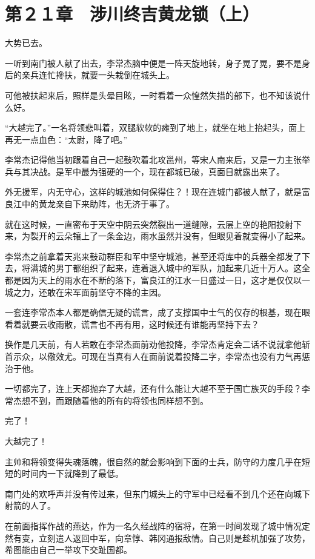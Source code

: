 \section{第２１章　涉川终吉黄龙锁（上）}

大势已去。

一听到南门被人献了出去，李常杰脑中便是一阵天旋地转，身子晃了晃，要不是身后的亲兵连忙搀扶，就要一头栽倒在城头上。

可他被扶起来后，照样是头晕目眩，一时看着一众惶然失措的部下，也不知该说什么好。

“大越完了。”一名将领悲叫着，双腿软软的瘫到了地上，就坐在地上抬起头，面上再无一点血色：“太尉，降了吧。”

李常杰记得他当初跟着自己一起鼓吹着北攻邕州，等宋人南来后，又是一力主张举兵与其决战。是军中最为强硬的一个，现在都城已破，真面目就露出来了。

外无援军，内无守心，这样的城池如何保得住？！现在连城门都被人献了，就是富良江中的黄龙亲自下来助阵，也无济于事了。

就在这时候，一直密布于天空中阴云突然裂出一道缝隙，云层上空的艳阳投射下来，为裂开的云朵镶上了一条金边，雨水虽然并没有，但眼见着就变得小了起来。

李常杰之前拿着天兆来鼓动群臣和军中坚守城池，甚至还将库中的兵器全都发了下去，将满城的男丁都组织了起来，连着退入城中的军队，加起来几近十万人。这全都是因为天上的雨水在不断的落下，富良江的江水一日盛过一日，这才是仅仅以一城之力，还敢在宋军面前坚守不降的主因。

一套连李常杰本人都是确信无疑的谎言，成了支撑国中士气的仅存的根基，现在眼看着就要云收雨散，谎言也不再有用，这时候还有谁能再坚持下去？

换作是几天前，有人若敢在李常杰面前劝他投降，李常杰肯定会二话不说就拿他斩首示众，以儆效尤。可现在当真有人在面前说着投降二字，李常杰也没有力气再惩治于他。

一切都完了，连上天都抛弃了大越，还有什么能让大越不至于国亡族灭的手段？李常杰想不到，而跟随着他的所有的将领也同样想不到。

完了！

大越完了！

主帅和将领变得失魂落魄，很自然的就会影响到下面的士兵，防守的力度几乎在短短的时间内一下就降到了最低。

南门处的欢呼声并没有传过来，但东门城头上的守军中已经看不到几个还在向城下射箭的人了。

在前面指挥作战的燕达，作为一名久经战阵的宿将，在第一时间发现了城中情况定然有变，立刻遣人返回中军，向章惇、韩冈通报敌情。自己则是趁机加强了攻势，希图能由自己一举攻下交趾国都。

